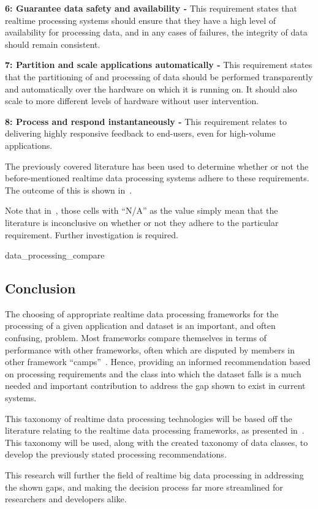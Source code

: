 \noindent \textbf{6: Guarantee data safety and availability -} This requirement states that realtime processing systems
should ensure that they have a high level of availability for processing data, and in any cases of failures, the integrity
of data should remain consistent.

\noindent \textbf{7: Partition and scale applications automatically -} This requirement states that the partitioning of
and processing of data should be performed transparently and automatically over the hardware on which it is running on.
It should also scale to more different levels of hardware without user intervention.

\noindent \textbf{8: Process and respond instantaneously -} This requirement relates to delivering highly responsive
feedback to end-users, even for high-volume applications.

The previously covered literature has been used to determine whether or not the before-mentioned realtime data processing
systems adhere to these requirements. The outcome of this is shown in~.

Note that in~, those cells with ``N/A'' as the value simply mean that the literature
is inconclusive on whether or not they adhere to the particular requirement. Further investigation is required.

{data_processing_compare}




\subsection{Conclusion} %
\label{sec:conclusion_litrev}

The choosing of appropriate realtime data processing frameworks for the processing of a given application and dataset
is an important, and often confusing, problem. Most frameworks compare themselves in terms of performance with other
frameworks, often which are disputed by members in other framework ``camps''~\cite{web_slideshare_b,web_slideshare_a}.
Hence, providing an informed recommendation based on processing requirements and the class into which the dataset
falls is a much needed and important contribution to address the gap shown to exist in current systems.

This taxonomy of realtime data processing technologies will be based off the literature relating to the realtime data
processing frameworks, as presented in~. This taxonomy will be used, along with the
created taxonomy of data classes, to develop the previously stated processing recommendations.

This research will further the field of realtime big data processing in addressing the shown gaps, and making the
decision process far more streamlined for researchers and developers alike.


